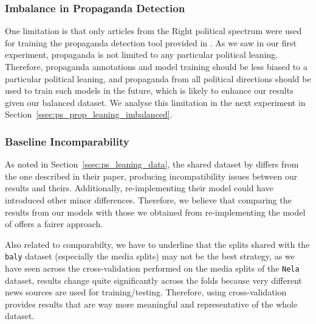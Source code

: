 \subsubsection{Imbalance in Propaganda Detection}
One limitation is that only articles from the Right political spectrum were used for training the propaganda detection tool provided in \citet{da2019fine}. %
As we saw in our first experiment, propaganda is not limited to any particular political leaning. Therefore, propaganda annotations and model training should be less biased to a particular political leaning, and propaganda from all political directions should be used to train such models in the future, which is likely to enhance our results given our balanced dataset. We analyse this limitation in the next experiment in Section~\ref{ssec:ps_prop_leaning_imbalanced}.

\subsubsection{Baseline Incomparability} %
As noted in Section~\ref{ssec:ps_leaning_data}, the shared dataset by \citet{baly2020we} differs from the one described in their paper, producing incompatibility issues between our results and theirs. %
Additionally, re-implementing their model could have introduced other minor differences. Therefore, we believe that comparing the results from our models with those we obtained from re-implementing the model of \citet{baly2020we} offers a fairer approach. %

Also related to comparabilty, we have to underline that the splits shared with the \texttt{baly} dataset (especially the media splits) may not be the best strategy, as we have seen across the cross-validation performed on the media splits of the \texttt{Nela} dataset, results change quite significantly across the folds because very different news sources are used for training/testing. Therefore, using cross-validation provides results that are way more meaningful and representative of the whole dataset.

